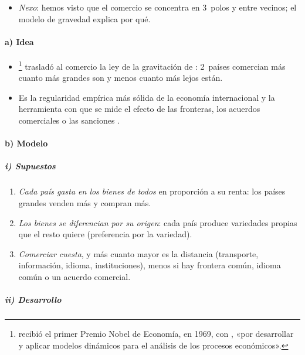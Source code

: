 \documentclass[11pt]{article}
\begin{document}
\begin{itemize}
\item \emph{Nexo}: hemos visto que el comercio se concentra en 3~polos y entre vecinos; el modelo de gravedad explica por qué.
\end{itemize}

\paragraph{a) Idea}

\begin{itemize}
\item \textcite{Tinbergen1962Shaping}\footnote{ recibió el primer Premio Nobel de Economía, en 1969, con , «por desarrollar y aplicar modelos dinámicos para el análisis de los procesos económicos»\nocite{Nobel1969}.} trasladó al comercio la ley de la gravitación de : 2~países comercian más cuanto más grandes son y menos cuanto más lejos están.
\item Es la regularidad empírica más sólida de la economía internacional y la herramienta con que se mide el efecto de las fronteras, los acuerdos comerciales o las sanciones .
\end{itemize}

\paragraph{b) Modelo}

\subparagraph{i) Supuestos}

\begin{enumerate}
\item \emph{Cada país gasta en los bienes de todos} en proporción a su renta: los países grandes venden más y compran más.
\item \emph{Los bienes se diferencian por su origen}: cada país produce variedades propias que el resto quiere (preferencia por la variedad).
\item \emph{Comerciar cuesta}, y más cuanto mayor es la distancia (transporte, información, idioma, instituciones), menos si hay frontera común, idioma común o un acuerdo comercial.
\end{enumerate}

\subparagraph{ii) Desarrollo}
\end{document}
